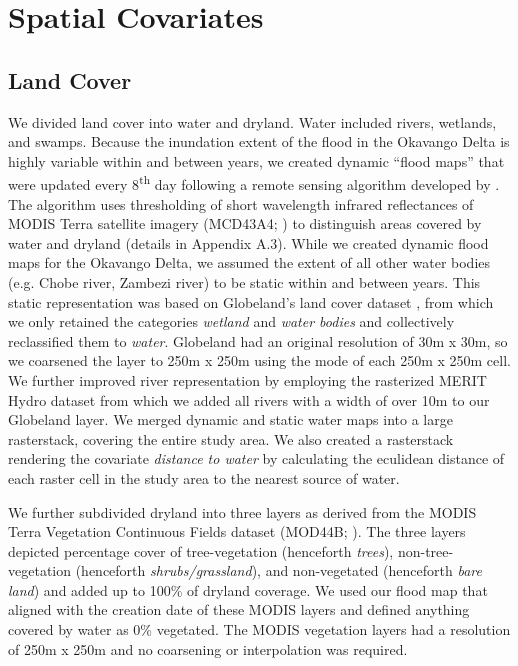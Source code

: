 \documentclass[abstract=off,10pt,a4paper,bibliography=totocnumbered]{article}
\begin{document}
\newpage
\section{Spatial Covariates}
\subsection{Land Cover}
We divided land cover into water and dryland. Water included rivers, wetlands,
and swamps. Because the inundation extent of the flood in the Okavango Delta is
highly variable within and between years, we created dynamic ``flood maps'' that
were updated every 8\textsuperscript{th} day following a remote sensing
algorithm developed by \cite{Wolski.2017}. The algorithm uses thresholding of
short wavelength infrared reflectances of MODIS Terra satellite imagery
(MCD43A4; \citealp{Schaaf.2015}) to distinguish areas covered by water and
dryland (details in Appendix A.3). While we created dynamic flood maps for the
Okavango Delta, we assumed the extent of all other water bodies (e.g. Chobe
river, Zambezi river) to be static within and between years. This static
representation was based on Globeland's land cover dataset \citep{Chen.2015},
from which we only retained the categories \textit{wetland} and \textit{water
bodies} and collectively reclassified them to \textit{water}. Globeland had an
original resolution of 30m x 30m, so we coarsened the layer to 250m x 250m using
the mode of each 250m x 250m cell. We further improved river representation by
employing the rasterized MERIT Hydro dataset \citep{Yamazaki.2019} from which we
added all rivers with a width of over 10m to our Globeland layer. We merged
dynamic and static water maps into a large rasterstack, covering the entire
study area. We also created a rasterstack rendering the covariate
\textit{distance to water} by calculating the eculidean distance of each raster
cell in the study area to the nearest source of water.

We further subdivided dryland into three layers as derived from the MODIS Terra
Vegetation Continuous Fields dataset (MOD44B; \citealp{Dimiceli.2015}). The
three layers depicted percentage cover of tree-vegetation (henceforth
\textit{trees}), non-tree-vegetation (henceforth \textit{shrubs/grassland}), and
non-vegetated (henceforth \textit{bare land}) and added up to 100\% of dryland
coverage. We used our flood map that aligned with the creation date of these
MODIS layers and defined anything covered by water as 0\% vegetated. The MODIS
vegetation layers had a resolution of 250m x 250m and no coarsening or
interpolation was required.
\end{document}
